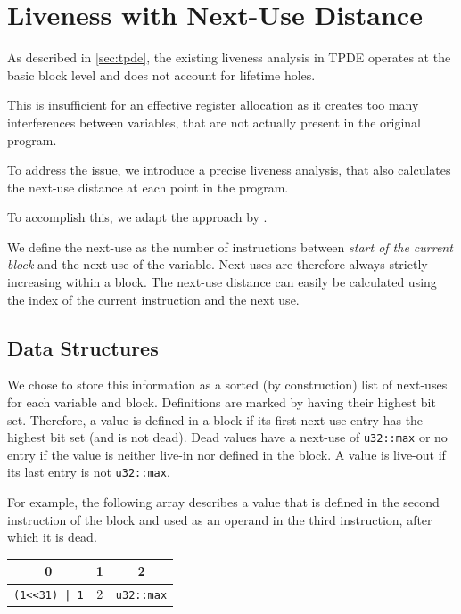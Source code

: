\section{Liveness with Next-Use Distance}

As described in \autoref{sec:tpde}, the existing liveness analysis in TPDE operates at the basic block level and does not account for lifetime holes.

This is insufficient for an effective register allocation as it creates too many interferences between variables, that are not actually present in the original program.

To address the issue, we introduce a precise liveness analysis, that also calculates the next-use distance at each point in the program.

To accomplish this, we adapt the approach by \textcite{fast-liveness}.  %

We define the next-use as the number of instructions between \emph{start of the current block} and the next use of the variable. Next-uses are therefore always strictly increasing within a block. The next-use distance can easily be calculated using the index of the current instruction and the next use.

\subsection{Data Structures}

We chose to store this information as a sorted (by construction) list of next-uses for each variable and block. Definitions are marked by having their highest bit set. Therefore, a value is defined in a block if its first next-use entry has the highest bit set (and is not dead). Dead values have a next-use of \texttt{u32::max} or no entry if the value is neither live-in nor defined in the block. A value is live-out if its last entry is not \texttt{u32::max}. 

For example, the following array describes a value that is defined in the second instruction of the block and used as an operand in the third instruction, after which it is dead.

\begin{center}
    \begin{tabular}{|c|c|c|}
        \hline
        0 & 1 & 2 \\
        \hline
        \texttt{(\texttt{1<<31}) |  1} & 2 & \texttt{u32::max} \\
        \hline
    \end{tabular}
\end{center}

